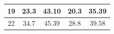 \documentclass{article}
\begin{document}
\begin{Large}
\begin{table}[h]
\begin{tabular}{|c|cc|cc|}
19                                                                       & \multicolumn{1}{c|}{23.3}                                                    & 43.10                                                       & \multicolumn{1}{c|}{20.3}                                                    & 35.39                                                       \\ \hline
22                                                                       & \multicolumn{1}{c|}{34.7}                                                    & 45.39                                                       & \multicolumn{1}{c|}{28.8}                                                    & 39.58                                                       \\ \hline
\end{tabular}
\end{table}


\end{Large}
\end{document}
